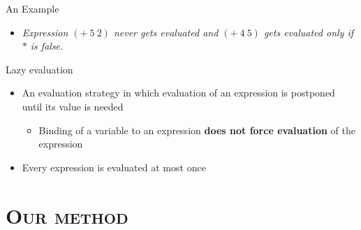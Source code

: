 \documentclass[xcolor=x11names,compress,mathserif]{beamer}
\renewcommand{\(}{\begin{columns}}
\renewcommand{\)}{\end{columns}}
\newcommand{\<}[1]{\begin{column}{#1}}
\renewcommand{\>}{\end{column}}
\begin{document}
\begin{frame}{An Example}


\bigskip
\begin{itemize}
\item<1->{\em  Expression $(+\ 5\ 2)$ never gets evaluated and $(+\ 4\ 5)$ gets evaluated only if $*$ is false.}  
\end{itemize}
\end{frame}

\begin{frame} {Lazy evaluation}
\begin{itemize}
\item An evaluation  strategy in which evaluation of  an expression is
  postponed until its value is needed
  \begin{itemize}
  \item Binding  of a  variable to  an expression  {\bf does  not force
    evaluation} of the expression
  \end{itemize}
\item Every expression is evaluated at most once
\end{itemize}
\end{frame}
\section{\scshape Our method}

\end{document}
